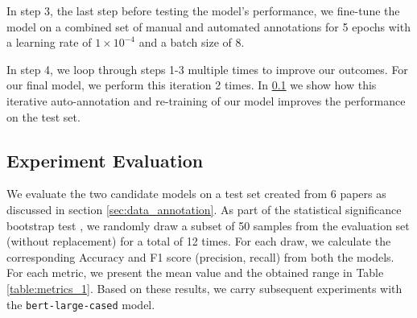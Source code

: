 \documentclass[11pt]{article}
\begin{document}
In step 3, the last step before testing the model's performance, we fine-tune the model on a combined set of manual and automated annotations for 5 epochs with a learning rate of $1\times10^{-4}$ and a batch size of 8.

In step 4, we loop through steps 1-3 multiple times to improve our outcomes. For our final model, we perform this iteration 2 times. In \ref{sec:metrics} we show how this iterative auto-annotation and re-training of our model improves the performance on the test set.

\subsection{Experiment Evaluation}\label{sec:metrics}
We evaluate the two candidate models on a test set created from 6 papers as discussed in section \ref{sec:data_annotation}. As part of the statistical significance bootstrap test , we randomly draw a subset of 50 samples from the evaluation set (without replacement) for a total of 12 times. For each draw, we calculate the corresponding Accuracy and F1 score (precision, recall) from both the models. For each metric, we present the mean value and the obtained range in Table \ref{table:metrics_1}. Based on these results, we carry subsequent experiments with the \texttt{bert-large-cased} model.

\end{document}

